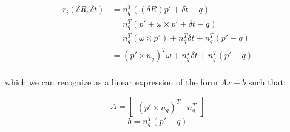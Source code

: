 \documentclass{article}
\begin{document}
\begin{align*}
    r_i(\delta R, \delta t) &= n_q^T((\delta R)p' + \delta t - q) \\
    &= n_q^T(p' + \omega \times p' + \delta t - q) \\
    &= n_q^T(\omega \times p') + n_q^T \delta t + n_q^T(p' - q) \\
    &= (p' \times n_q)^T\omega + n_q^T \delta t + n_q^T(p' - q) \\
\end{align*}

which we can recognize as a linear expression of the form $Ax + b$ such that:

\[ A = \begin{bmatrix} (p' \times n_q)^T & n_q^T \end{bmatrix} \]
\[ b = n_q^T(p' - q) \]
\end{document}
